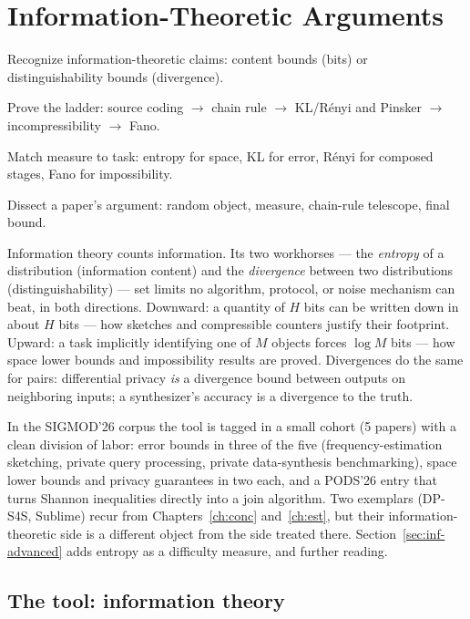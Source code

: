 \chapter{Information-Theoretic Arguments}
\setcounter{section}{-1}   %
\label{ch:inf}

\begin{objectives}
\item Recognize information-theoretic claims: content bounds (bits) or distinguishability bounds (divergence).
\item Prove the ladder: source coding $\to$ chain rule $\to$ KL/R\'enyi and Pinsker $\to$ incompressibility $\to$ Fano.
\item Match measure to task: entropy for space, KL for error, R\'enyi for composed stages, Fano for impossibility.
\item Dissect a paper's argument: random object, measure, chain-rule telescope, final bound.
\end{objectives}

Information theory counts information. Its two workhorses --- the \emph{entropy} of a
distribution (information content) and the \emph{divergence} between two distributions
(distinguishability) --- set limits no algorithm, protocol, or noise mechanism can
beat, in both directions. Downward: a quantity of $H$ bits can be written down in
about $H$ bits --- how sketches and compressible counters justify their footprint.
Upward: a task implicitly identifying one of $M$ objects forces $\log M$ bits --- how
space lower bounds and impossibility results are proved. Divergences do the same for
pairs: differential privacy \emph{is} a divergence bound between outputs on
neighboring inputs; a synthesizer's accuracy is a divergence to the truth.

In the SIGMOD'26 corpus the tool is tagged in a small cohort (5 papers) with a clean
division of labor: error bounds in three of the five (frequency-estimation sketching,
private query processing, private data-synthesis benchmarking), space lower bounds and
privacy guarantees in two each, and a PODS'26 entry that turns Shannon inequalities
directly into a join algorithm. Two exemplars (DP-S4S, Sublime) recur from
Chapters~\ref{ch:conc} and~\ref{ch:est}, but their information-theoretic side is a
different object from the side treated there. Section~\ref{sec:inf-advanced} adds
entropy as a difficulty measure, and further reading.

\section{The tool: information theory}

